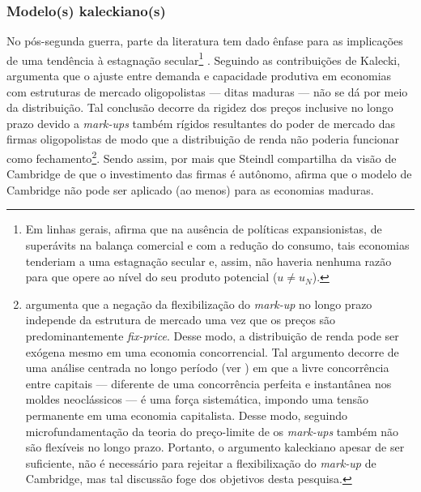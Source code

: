 \subsubsection{Modelo(s) kaleckiano(s)}

No pós-segunda guerra, parte da literatura tem dado ênfase para 
as implicações de uma tendência à estagnação secular\footnote{Em linhas gerais, \textcite{steindl_stagnation_1979} afirma que na ausência de políticas expansionistas, de superávits na balança comercial e com a redução do consumo,  tais economias tenderiam a uma estagnação secular e, assim,  não haveria nenhuma razão para que opere ao nível do seu produto potencial ($u \neq u_N$).} \cite{setterfield_distribution_2002}.
Seguindo as contribuições de Kalecki, \textcite{steindl_maturity_1952} argumenta que o ajuste entre demanda e capacidade produtiva em economias com  estruturas de mercado oligopolistas --- ditas maduras --- não se dá por meio da distribuição.
Tal conclusão decorre da rigidez dos preços inclusive no longo prazo devido a \textit{mark-ups} também rígidos resultantes do poder de mercado das firmas oligopolistas de modo que a distribuição de renda não poderia funcionar como fechamento\footnote{
	\textcite{serrano_sraffian_1995} argumenta que a negação da flexibilização do \textit{mark-up} no longo prazo independe da estrutura de mercado uma vez que os preços são predominantemente \textit{fix-price}. Desse modo, a distribuição de renda pode ser exógena mesmo em uma economia concorrencial. Tal argumento decorre de uma análise centrada no longo período (ver \textcite{milgate_capital_1982}) em que a livre concorrência entre capitais --- diferente de uma concorrência perfeita e instantânea nos moldes neoclássicos ---  é uma força sistemática, impondo uma tensão permanente em uma economia capitalista. 
	Desse modo, seguindo microfundamentação da teoria do preço-limite de \textcite{labini} os \textit{mark-ups} também não são flexíveis no longo prazo.
	Portanto, o argumento kaleckiano apesar de ser suficiente,  não é necessário para  rejeitar a flexibilixação do \textit{mark-up} de Cambridge, mas tal discussão foge dos objetivos desta pesquisa.
}.
Sendo assim, por mais que Steindl compartilha da visão de Cambridge de que o investimento das firmas é autônomo, afirma que o modelo de Cambridge não pode ser aplicado (ao menos) para as economias maduras.  


